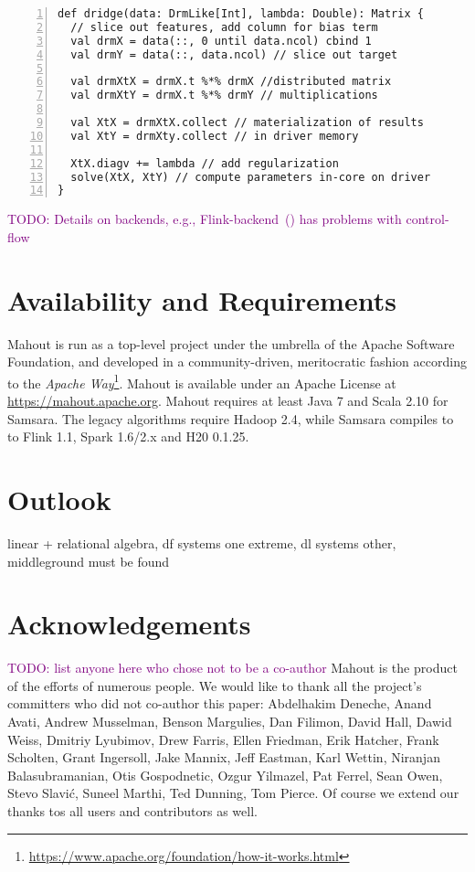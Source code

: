 \documentclass[twoside,11pt]{article}
\newcommand{\todo}[1]{\textcolor{purple}{TODO: #1}}
\begin{document}
\begin{lstlisting}[numbers=left,numberstyle={\tiny},caption={Distributed Ridge Regression for tall \& skinny matrices using Samsara.},captionpos=b,label={lst:linearRegr}]
def dridge(data: DrmLike[Int], lambda: Double): Matrix {
  // slice out features, add column for bias term
  val drmX = data(::, 0 until data.ncol) cbind 1
  val drmY = data(::, data.ncol) // slice out target

  val drmXtX = drmX.t %*% drmX //distributed matrix
  val drmXtY = drmX.t %*% drmY // multiplications

  val XtX = drmXtX.collect // materialization of results
  val XtY = drmXty.collect // in driver memory

  XtX.diagv += lambda // add regularization
  solve(XtX, XtY) // compute parameters in-core on driver
}
\end{lstlisting}

\todo{Details on backends, e.g., Flink-backend~(\cite{Alexandrov2014}) has problems with control-flow}

\section{Availability and Requirements}

Mahout is run as a top-level project under the umbrella of the Apache Software Foundation, and developed in a community-driven, meritocratic fashion according to the \textit{Apache Way}\footnote{\url{https://www.apache.org/foundation/how-it-works.html}}. Mahout is available under an Apache License at \url{https://mahout.apache.org}. Mahout requires at least Java 7 and Scala 2.10 for Samsara. The legacy algorithms require Hadoop 2.4, while Samsara compiles to to Flink 1.1, Spark 1.6/2.x and H20 0.1.25.

\section{Outlook}

linear + relational algebra, df systems one extreme, dl systems other, middleground must be found

\section{Acknowledgements}
\todo{list anyone here who chose not to be a co-author} Mahout is the product of the efforts of numerous people. We would like to thank all the project's committers who did not co-author this paper: Abdelhakim Deneche, Anand Avati, Andrew Musselman, Benson Margulies, Dan Filimon, David Hall, Dawid Weiss, Dmitriy Lyubimov, Drew Farris, Ellen Friedman, Erik Hatcher, Frank Scholten, Grant Ingersoll, Jake Mannix, Jeff Eastman, Karl Wettin, Niranjan Balasubramanian, Otis Gospodnetic, Ozgur Yilmazel, Pat Ferrel,  Sean Owen, Stevo Slavić, Suneel Marthi, Ted Dunning, Tom Pierce. Of course we extend our thanks tos all users and contributors as well.

\vskip 0.2in

\end{document}
